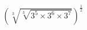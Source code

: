 \documentclass[preview]{standalone}
\begin{document}
\begin{align*}
\displaystyle \left( \sqrt[3]{\sqrt[3]{3^5 \times 3^6 \times 3^7}} \right)^\frac{1}{2}
\end{align*}
\end{document}
